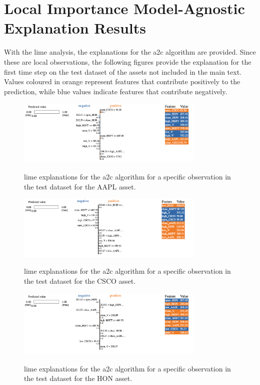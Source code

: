 \clearpage
\section{Local Importance Model-Agnostic Explanation Results} \label{app:lime_explanations}

With the \acrshort{lime} analysis, the explanations for the \acrshort{a2c} algorithm are provided. Since these are local observations, the following figures provide the explanation for the first time step on the test dataset of the assets not included in the main text. Values coloured in orange represent features that contribute positively to the prediction, while blue values indicate features that contribute negatively.

\begin{figure}
    \centering
    \includegraphics[width=0.8\textwidth]{figures/a2c_lime_aapl.png}
    \label{fig:a2c_lime_aapl}
    \caption{\acrshort{lime} explanations for the \acrshort{a2c} algorithm for a specific observation in the test dataset for the AAPL asset.}
\end{figure}

\begin{figure}
    \centering
    \includegraphics[width=0.8\textwidth]{figures/a2c_lime_csco.png}
    \label{fig:a2c_lime_csco}
    \caption{\acrshort{lime} explanations for the \acrshort{a2c} algorithm for a specific observation in the test dataset for the CSCO asset.}
\end{figure}

\begin{figure}
    \centering
    \includegraphics[width=0.8\textwidth]{figures/a2c_lime_hon.png}
    \label{fig:a2c_lime_hon}
    \caption{\acrshort{lime} explanations for the \acrshort{a2c} algorithm for a specific observation in the test dataset for the HON asset.}
\end{figure}

